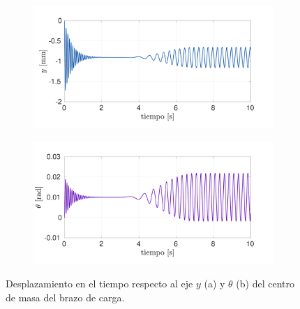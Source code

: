 \begin{figure}[p]
\centering
	\begin{subfigure}{1\linewidth}
		\centering
		\includegraphics[width=1\linewidth]{Imagenes/y_2.pdf}
		\caption{}\label{fig:y_2}
	\end{subfigure}
	\begin{subfigure}{1\linewidth}
		\centering
		\includegraphics[width=1\linewidth]{Imagenes/t_2.pdf}
		\caption{}\label{fig:t_2}
	\end{subfigure}
\par\bigskip
\caption{Desplazamiento en el tiempo respecto al eje $y$ (a) y $\theta$ (b) del centro de masa del brazo de carga.}
\label{fig:yt_2}
\end{figure}


